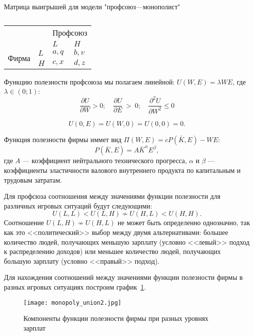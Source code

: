 \begin{table}[h]
	\centering
	\caption{}
		\footnotesize Матрица выигрышей для модели "профсоюз---монополист"\\
		\normalsize
	\begin{tabular}{|l|l|l|l|}
		\hline
		\multicolumn{2}{|l|}{\multirow{2}{*}{}} & \multicolumn{2}{l|}{Профсоюз} \\ \cline{3-4} 
		\multicolumn{2}{|l|}{}                  & $L$            & $H$            \\ \hline
		\multirow{2}{*}{Фирма}     & $L$     & $a,q$          & $b,v$          \\ \cline{2-4} 
		& $H$     & $c,x$          & $d,z$          \\ \hline
	\end{tabular}
	\label{tab:mono:prof}
\end{table}
Функцию полезности профсоюза мы полагаем линейной: $U(W,E)=\lambda WE$, где $\lambda \in(0;1)$:
$$
	\frac{\partial U}{\partial W} > 0; 
	\quad 
	\frac{\partial U}{\partial E}~>~0 ; 
	\quad
	\frac{\partial^2 U}{\partial W^2} \leqslant 0
$$

$$
	U(0,E) = U(W,0) = U(0,0) = 0.
$$

Функция полезности фирмы иммет вид $\Pi(W,E)=cP(\bar{K},E)-WE$:
$$P(\bar{K}, E)=A\bar{K}^\alpha E^\beta,$$ 
где $A$ --- коэффициент нейтрального технического прогресса, $\alpha$ и $\beta$
--- коэффициенты эластичности валового внутреннего продукта по капитальным и
трудовым затратам.

Для профсюза соотношения между значениями функции полезности для различных игровых ситуаций
будут следующими:
\begin{equation}
U(L,L) < U(L,H) \nsim U(H, L) < U(H,H).
\end{equation}
Соотношение $U(L,H) \nsim U(H, L)$ не может быть определенно однозначно, так
как это <<политический>> выбор между двумя альтернативами: большее количество
людей, получающих меньшую зарплату (условно <<левый>> подход к распределению
доходов) или меньшее количество людей, получающих большую зарплату (условно
<<правый>> подход). 

Для нахождения соотношений между значениями функции полезности фирмы в разных игровых ситуациях
построим график~\ref{fig:monopoly_union1}.

\begin{figure}[h]
	\texttt{[image: monopoly\_union2.jpg]}
	\caption{Компоненты функции полезности фирмы при разных уровнях зарплат}
	\label{fig:monopoly_union1}
\end{figure}

